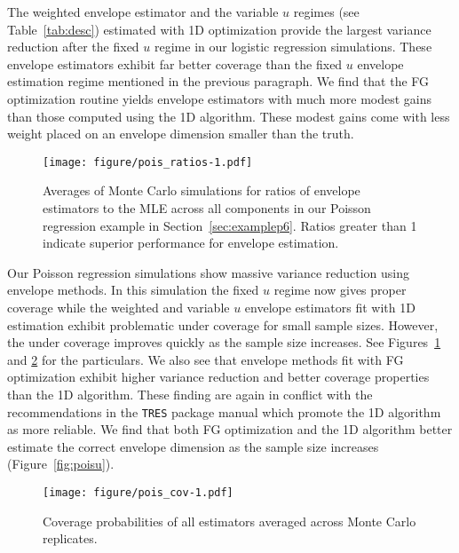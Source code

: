 \documentclass{article}\usepackage[]{graphicx}\usepackage[]{color}
\begin{document}
The weighted envelope estimator and the variable $u$ regimes (see Table~\ref{tab:desc}) estimated with 1D optimization provide the largest variance reduction after the fixed $u$ regime in our logistic regression simulations. These envelope estimators exhibit far better coverage than the fixed $u$ envelope estimation regime mentioned in the previous paragraph. We find that the FG optimization routine yields envelope estimators with much more modest gains than those computed using the 1D algorithm. These modest gains come with less weight placed on an envelope dimension smaller than the truth.


\begin{figure}[h!]
	\texttt{[image: figure/pois\_ratios-1.pdf]}
	\caption{Averages of Monte Carlo simulations for ratios of envelope estimators to the MLE across all components in our Poisson regression example in Section~\ref{sec:examplep6}. Ratios greater than 1 indicate superior performance for envelope estimation.}
	\label{fig:poisratios}
\end{figure}


Our Poisson regression simulations show massive variance reduction using envelope methods. In this simulation the fixed $u$ regime now gives proper coverage while the weighted and variable $u$ envelope estimators fit with 1D estimation exhibit problematic under coverage for small sample sizes. However, the under coverage improves quickly as the sample size increases. See Figures~\ref{fig:poisratios} and \ref{fig:poiscov} for the particulars. We also see that envelope methods fit with FG optimization exhibit higher variance reduction and better coverage properties than the 1D algorithm. These finding are again in conflict with the recommendations in the \texttt{TRES} package manual which promote the 1D algorithm as more reliable. We find that both FG optimization and the 1D algorithm better estimate the correct envelope dimension as the sample size increases (Figure~\ref{fig:poisu}). 

\begin{figure}[h!]
	\texttt{[image: figure/pois\_cov-1.pdf]}
	\caption{Coverage probabilities of all estimators averaged across Monte Carlo replicates.}
	\label{fig:poiscov}	
\end{figure}
\end{document}
